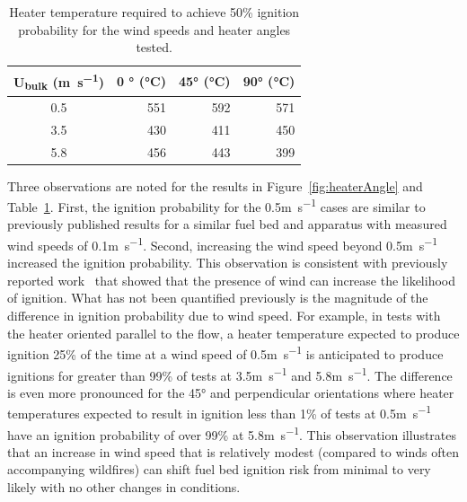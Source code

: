             \begin{table}[hpbt]
                \normalsize
                \caption{Heater temperature required to achieve 50\% ignition probability for the wind speeds and heater angles tested.}
                \centering
                \begin{tabular}{crrr}
                    \rowcolor{gray!50}
                   U\textsubscript{bulk} (\si{\meter\per\second}) & 0 \si{\degree} (\si{\celsius}) & 45\si{\degree} (\si{\celsius}) & 90\si{\degree} (\si{\celsius})\\
                    \hline
                    0.5  & 551 & 592 & 571\\
                    3.5  & 430 & 411 & 450\\
                    5.8  & 456 & 443 & 399
                \end{tabular}
                \label{tab:fiftyTemp}
            \end{table}
    Three observations are noted for the results in Figure~\ref{fig:heaterAngle} and Table~\ref{tab:fiftyTemp}. 
    First, the ignition probability for the 0.5\si{\meter\per\second} cases are similar to previously published results for a similar fuel bed and apparatus with measured wind speeds of 0.1\si{\meter\per\second}\cite{Bean2021}. Second, increasing the wind speed beyond 0.5\si{\meter\per\second} increased the ignition probability. This observation is consistent with previously reported work~\cite{Ganteaume2009, Matvienko2018} that showed that the presence of wind can increase the likelihood of ignition. What has not been quantified previously is the magnitude of the difference in ignition probability due to wind speed. For example, in tests with the heater oriented parallel to the flow, a heater temperature expected to produce ignition 25\% of the time at a wind speed of 0.5\si{\meter\per\second} is anticipated to produce ignitions for greater than 99\% of tests at 3.5\si{\meter\per\second} and 5.8\si{\meter\per\second}. The difference is even more pronounced for the 45\si{\degree} and perpendicular orientations where heater temperatures expected to result in ignition less than 1\% of tests at 0.5\si{\meter\per\second} have an ignition probability of over 99\% at 5.8\si{\meter\per\second}. This observation illustrates that an increase in wind speed that is relatively modest (compared to winds often accompanying wildfires) can shift fuel bed ignition risk from minimal to very likely with no other changes in conditions.
    
